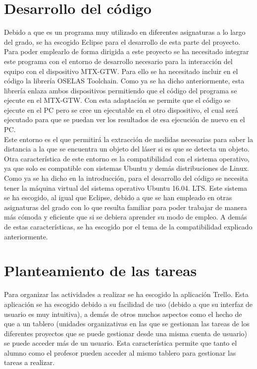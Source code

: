 \section{Desarrollo del código}

Debido a que es un programa muy utilizado en diferentes asignaturas a lo largo del grado, se ha escogido Eclipse para el desarrollo de esta parte del proyecto. Para poder emplearlo de forma dirigida a este proyecto se ha necesitado integrar este programa con el entorno de desarrollo necesario para la interacción del equipo con el dispositivo  MTX-GTW. Para ello se ha necesitado incluir en el código la librería OSELAS Toolchain. Como ya se ha dicho anteriormente, esta librería enlaza ambos dispositivos permitiendo que el código del programa se ejecute en el  MTX-GTW. Con esta adaptación se permite que el código se ejecute en el PC pero se cree un ejecutable en el otro dispositivo, el cual será ejecutado para que se puedan ver los resultados de esa ejecución de nuevo en el PC.\\
Este entorno es el que permitirá la extracción de medidas necesarias para saber la distancia a la que se encuentra un objeto del láser si es que se detecta un objeto. Otra característica de este entorno es la compatibilidad con el sistema operativo, ya que solo es compatible con sistemas Ubuntu y demás distribuciones de Linux. \\
Como ya se ha dicho en la introducción,  para el desarrollo del código se necesita tener la máquina virtual del sistema operativo Ubuntu 16.04. LTS. Este sistema se ha escogido, al igual que Eclipse, debido a que se han empleado en otras asignaturas del grado con lo que resulta familiar para poder trabajar de manera más cómoda y eficiente que si se debiera aprender su modo de empleo. A demás de estas características, se ha escogido por el tema de la compatibilidad explicado anteriormente.\\

\section{Planteamiento de las tareas}

Para organizar las actividades a realizar se ha escogido la aplicación Trello. Esta aplicación se ha escogido debido a su facilidad de uso (debido a que su interfaz de usuario es muy intuitiva), a demás de otros muchos aspectos como el hecho de que a un tablero (unidades organizativas en las que se gestionan las tareas de los diferentes proyectos que se puede gestionar desde una misma cuenta de usuario) se puede acceder más de un usuario. Esta característica permite que tanto el alumno como el profesor pueden acceder al mismo tablero para gestionar las tareas a realizar.

